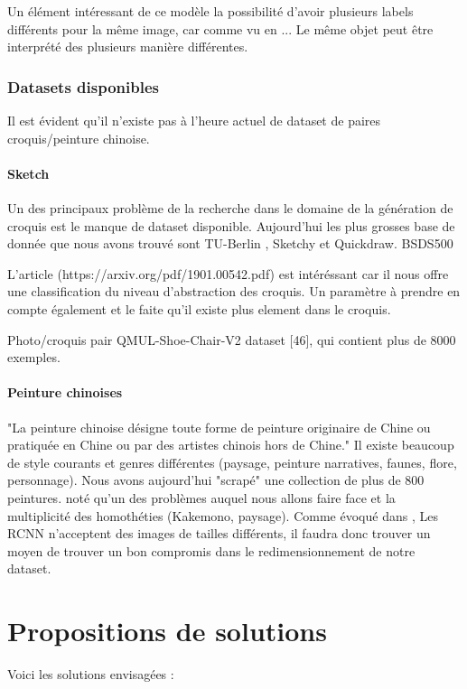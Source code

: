 \documentclass[a4paper, 12pt]{book}
\begin{document}
Un élément intéressant de ce modèle la possibilité d'avoir plusieurs labels différents pour la même image, car comme vu en ... Le même objet peut être interprété des plusieurs manière différentes. 


\subsection{Datasets disponibles}
Il est évident qu'il n'existe pas à l'heure actuel de dataset de paires croquis/peinture chinoise.

\subsubsection{Sketch}
Un des principaux problème de la recherche dans le domaine de la génération de croquis est le manque de dataset disponible. Aujourd'hui les plus grosses base de donnée que nous avons trouvé sont TU-Berlin \cite{eitz2012hdhso}, Sketchy \cite{sketchy2016} et Quickdraw. BSDS500

L'article (https://arxiv.org/pdf/1901.00542.pdf) est intéréssant car il nous offre une classification du niveau d'abstraction des croquis.
Un paramètre à prendre en compte également et le faite qu'il existe plus element dans le croquis.


Photo/croquis pair QMUL-Shoe-Chair-V2 dataset [46], qui contient plus de 8000 exemples.

\subsubsection{Peinture chinoises}
"La peinture chinoise désigne toute forme de peinture originaire de Chine ou pratiquée en Chine ou par des artistes chinois hors de Chine." \cite{} Il existe beaucoup de style courants et genres différentes (paysage, peinture narratives, faunes, flore, personnage). Nous avons aujourd'hui "scrapé" une collection de plus de 800 peintures.  noté qu'un des problèmes auquel nous allons faire face et la multiplicité des homothéties (Kakemono, paysage). Comme évoqué dans \cite{}, Les RCNN n'acceptent des images de tailles différents, il faudra donc trouver un moyen de trouver un bon compromis dans le redimensionnement de notre dataset.


\chapter{Propositions de solutions}

Voici les solutions envisagées  :
\end{document}
